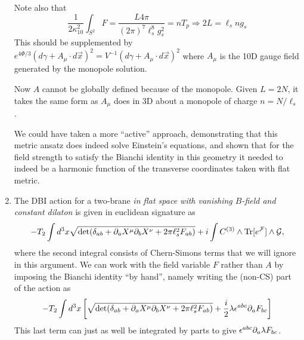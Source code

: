 \documentclass[11pt, class=article, crop=false]{standalone}
\begin{document}
\begin{enumerate}
	Note also that
	\[
		\frac{1}{2 \kappa_{10}^2} \int_{S^2} F = \frac{L 4 \pi}{(2\pi)^7 \ell_s^8 g_s^2} = n T_p \Rightarrow 2 L = \ell_s n g_s
	\]
	This should be supplemented by $e^{4 \Phi/3} (d\gamma + A_\mu \cdot d \vec x)^2 = V^{-1} (d\gamma + A_\mu \cdot d \vec x)^2$ where $A_\mu$ is the 10D gauge field generated by the monopole solution. 
	
	Now $A$ cannot be globally defined because of the monopole. Given $L = 2N$, it takes the same form as $A_\mu$ does in 3D about a monopole of charge $n = N/\ell_s$.
	
	We could have taken a more ``active'' approach, demonstrating that this metric ansatz does indeed solve Einstein's equations, and shown that for the field strength to satisfy the Bianchi identity in this geometry it needed to indeed be a harmonic function of the transverse coordinates taken with flat metric. 
	
	
	\item The DBI action for a two-brane \emph{in flat space with vanishing $B$-field and constant dilaton} is given in euclidean signature as
	\[
		- T_2 \int d^3 x \sqrt{\det (\delta_{ab} + \partial_a X^\mu \partial_b X^\nu + 2 \pi \ell_s^2 F_{ab})} + i \int C^{(3)} \wedge \mathrm{Tr}[e^{\mathcal F}] \wedge \mathcal G,
	\]
	where the second integral consists of Chern-Simons terms that we will ignore in this argument. We can work with the field variable $F$ rather than $A$ by imposing the Bianchi identity ``by hand'', namely writing the (non-CS) part of the action as
	\[
		-T_2 \int d^3 x \left[ \sqrt{\det (\delta_{ab} + \partial_a X^\mu \partial_b X^\nu + 2 \pi \ell_s^2 F_{ab})} + \frac{i}{2} \lambda \epsilon^{abc} \partial_a F_{b c} \right]
	\]
	This last term can just as well be integrated by parts to give $\epsilon^{abc} \partial_a \lambda F_{bc}$.
	

\end{enumerate}
\end{document}
